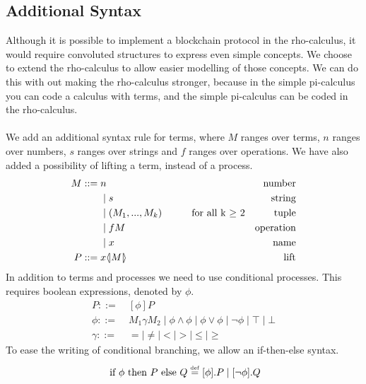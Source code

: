 \subsection{Additional Syntax} \label{sec:addsyntax}
Although it is possible to implement a blockchain protocol in the rho-calculus, it would require convoluted structures to express even simple concepts.
We choose to extend the rho-calculus to allow easier modelling of those concepts.
We can do this with out making the rho-calculus stronger, because in the simple pi-calculus you can code a calculus with terms\citep{Baldamus2005}, and the simple pi-calculus can be coded in the rho-calculus\citep{Meredith2005}.\\
\\
We add an additional syntax rule for terms, where $M$ ranges over terms, $n$ ranges over numbers, $s$ ranges over strings and $f$ ranges over operations. We have also added a possibility of lifting a term, instead of a process.
\begin{align*}
M::=\; & n &\text{number}\\
 &\mid s &\text{string}\\
 &\mid (M_1,...,M_k)\quad\quad\quad \text{for all k $\geq$ 2} &\text{tuple}\\
 &\mid fM &\text{operation}\\
 &\mid x &\text{name}\\ 
P::=\;& x \langle \! | M | \! \rangle&\text{lift}
 \end{align*}
In addition to terms and processes we need to use conditional processes. This requires boolean expressions, denoted by \ensuremath{\phi}.
\begin{align*}
P::=& \ [\phi] P\\
\phi ::=& \ M_1\gamma M_2 \mid \phi\land\phi \mid \phi\lor\phi \mid \neg\phi \mid \top \mid \bot\\
\gamma ::=& \ = \mid \neq \mid < \mid > \mid \leq \mid \geq
\end{align*}
To ease the writing of conditional branching, we allow an if-then-else syntax.
\begin{align*}
	\text{ if }\phi\text{ then }P\text{ else }Q \overset{\underset{\mathrm{def}}{}}{=} [\phi].P \mid [\neg \phi].Q
\end{align*}



